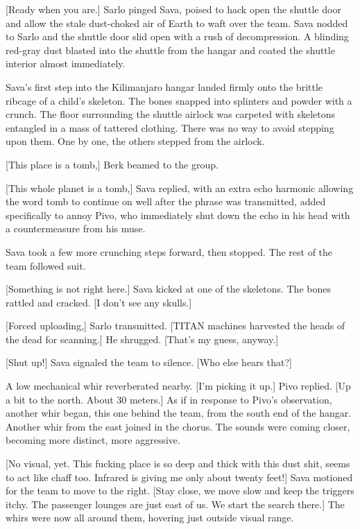 [Ready when you are.] Sarlo pinged Sava, poised to hack open the shuttle door and allow the stale dust-choked air of Earth to waft over the team. Sava nodded to Sarlo and the shuttle door slid open with a rush of decompression. A blinding red-gray dust blasted into the shuttle from the hangar and coated the shuttle interior almost immediately. 

Sava's first step into the Kilimanjaro hangar landed firmly onto the brittle ribcage of a child's skeleton. The bones snapped into splinters and powder with a crunch. The floor surrounding the shuttle airlock was carpeted with skeletons entangled in a mass of tattered clothing. There was no way to avoid stepping upon them. One by one, the others stepped from the airlock. 

[This place is a tomb,] Berk beamed to the group. 

[This whole planet is a tomb,] Sava replied, with an extra echo harmonic allowing the word tomb to continue on well after the phrase was transmitted, added specifically to annoy Pivo, who immediately shut down the echo in his head with a countermeasure from his muse. 

Sava took a few more crunching steps forward, then stopped. The rest of the team followed suit. 

[Something is not right here.] Sava kicked at one of the skeletons. The bones rattled and cracked. [I don't see any skulls.] 

[Forced uploading,] Sarlo transmitted. [TITAN machines harvested the heads of the dead for scanning.] He shrugged. [That's my guess, anyway.] 

[Shut up!] Sava signaled the team to silence. [Who else hears that?] 

A low mechanical whir reverberated nearby. [I'm picking it up.] Pivo replied. [Up a bit to the north. About 30 meters.] As if in response to Pivo's observation, another whir began, this one behind the team, from the south end of the hangar. Another whir from the east joined in the chorus. The sounds were coming closer, becoming more distinct, more aggressive. 

[No visual, yet. This fucking place is so deep and thick with this dust shit, seems to act like chaff too. Infrared is giving me only about twenty feet!] Sava motioned for the team to move to the right. [Stay close, we move slow and keep the triggers itchy. The passenger lounges are just east of us. We start the search there.] The whirs were now all around them, hovering just outside visual range. 


